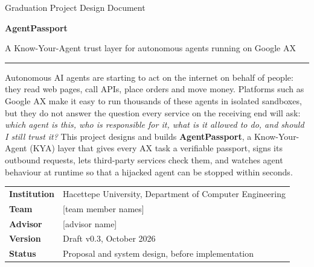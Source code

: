 \begin{titlepage}
\thispagestyle{empty}
\vspace*{1.5cm}
{\sffamily\color{kpurple}\large Graduation Project \textbullet{} Design Document\par}
\vspace{0.6cm}
{\sffamily\bfseries\fontsize{30}{36}\selectfont\color{kink} AgentPassport\par}
\vspace{0.4cm}
{\sffamily\LARGE\color{kink} A Know-Your-Agent trust layer for autonomous agents running on Google AX\par}
\vspace{1.0cm}
{\color{kpurple}\rule{\linewidth}{1.2pt}}
\vspace{0.6cm}

\begin{minipage}{0.92\linewidth}
\large
Autonomous AI agents are starting to act on the internet on behalf of people: they read web pages, call APIs, place orders and move money. Platforms such as Google AX make it easy to run thousands of these agents in isolated sandboxes, but they do not answer the question every service on the receiving end will ask: \emph{which agent is this, who is responsible for it, what is it allowed to do, and should I still trust it?} This project designs and builds \textbf{AgentPassport}, a Know-Your-Agent (KYA) layer that gives every AX task a verifiable passport, signs its outbound requests, lets third-party services check them, and watches agent behaviour at runtime so that a hijacked agent can be stopped within seconds.
\end{minipage}

\vfill
\begin{tabularx}{\linewidth}{@{}lX@{}}
\sffamily\bfseries Institution & Hacettepe University, Department of Computer Engineering\\
\sffamily\bfseries Team & [team member names]\\
\sffamily\bfseries Advisor & [advisor name]\\
\sffamily\bfseries Version & Draft v0.3, October 2026\\
\sffamily\bfseries Status & Proposal and system design, before implementation\\
\end{tabularx}
\vspace{0.5cm}
\end{titlepage}

\tableofcontents
\newpage
